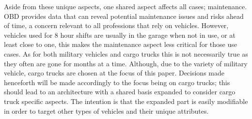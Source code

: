 \bigskip \noindent
Aside from these unique aspects, one shared aspect affects all cases; maintenance.
\ac{OBD} provides data that can reveal potential maintenance issues and risks ahead of time, a concern relevant to all professions that rely on vehicles.
However, vehicles used for 8 hour shifts are usually in the garage when not in use, or at least close to one, this makes the maintenance aspect less critical for those use cases.
As for both military vehicles and cargo trucks this is not necessarily true as they often are gone for months at a time.
Although, due to the variety of military vehicle, cargo trucks are chosen at the focus of this paper.
Decisions made henceforth will be made accordingly to the focus being on cargo trucks; this should lead to an architecture with a shared basis expanded to consider cargo truck specific aspects.
The intention is that the expanded part is easily modifiable in order to target other types of vehicles and their unique attributes.